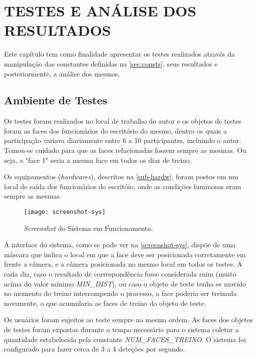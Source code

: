 
\chapter{TESTES E ANÁLISE DOS RESULTADOS}\label{ch:resultados}

Este capítulo tem como finalidade apresentar os testes realizados através da manipulação das constantes definidas na \autoref{sec:consts}, seus resultados e posteriormente, a análise dos mesmos.

\section{Ambiente de Testes}\label{sec:ambtest}

Os testes foram realizados no local de trabalho do autor e os objetos de testes foram as faces dos funcionários do escritório do mesmo, dentro os quais a participação variava diariamente entre 6 a 10 participantes, incluindo o autor. Tomou-se cuidado para que as faces relacionadas fossem sempre as mesmas. Ou seja, a "face 1" seria a mesma face em todos os dias de treino.

Os equipamentos (\textit{hardwares}), descritos na \autoref{sub-hardw}, foram postos em um local de saída dos funcionários do escritóio, onde as condições luminosas eram sempre as mesmas.


\begin{figure}[h]
	\centering
	\texttt{[image: screenshot-sys]}
	\caption{\textit{Screenshot} do Sistema em Funcionamento.}
	\label{screenshot-sys}
\end{figure}


A interface do sistema, como se pode ver na \autoref{screenshot-sys}, dispõe de uma máscara que indica o local em que a face deve ser posicionada corretamente em frente a câmera, e a câmera posicionada no mesmo local em todos os testes. A cada dia, caso o resultado de correspondência fosse considerada ruim (muito acima do valor mínimo \textit{MIN\_DIST}), ou caso o objeto de teste tenha se movido no momento do treino interrompendo o processo, a face poderia ser treinada novamente, o que acumularia as faces de treino do objeto de teste.

Os usuários foram sujeitos ao teste sempre na mesma ordem. As faces dos objetos de testes foram expostas durante o tempo necessário para o sistema coletar a quantidade estabelecida pela constante \textit{NUM\_FACES\_TREINO}. O sistema foi configurado para fazer cerca de 3 a 4 deteções por segundo.

